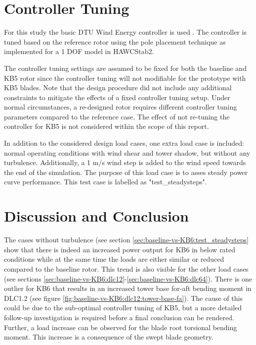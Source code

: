 \section{Controller Tuning}
\label{sec:dlb:Controller Tuning}

For this study the basic DTU Wind Energy controller is used \cite{hansen_basic_2013}. The controller is tuned based on the reference rotor using the pole placement technique as implemented for a 1 DOF model in HAWCStab2.

The controller tuning settings are assumed to be fixed for both the baseline and KB5 rotor since the controller tuning will not modifiable for the prototype with KB5 blades. Note that the design procedure did not include any additional constraints to mitigate the effects of a fixed controller tuning setup. Under normal circumstances, a re-designed rotor requires different controller tuning parameters compared to the reference case. The effect of not re-tuning the controller for KB5 is not considered within the scope of this report.

In addition to the considered design load cases, one extra load case is included: normal operating conditions with wind shear and tower shadow, but without any turbulence. Additionally, a 1 m/s wind step is added to the wind speed towards the end of the simulation. The purpose of this load case is to asses steady power curve performance. This test case is labelled as "test\_steadysteps".


\section{Discussion and Conclusion}
\label{sec:dlb:discussion}

The cases without turbulence (see section \ref{sec:baseline-vs-KB6:test_steadysteps} show that there is indeed an increased power output for KB6 in below rated conditions while at the same time the loads are either similar or reduced compared to the baseline rotor. This trend is also visible for the other load cases (see sections \ref{sec:baseline-vs-KB6:dlc12}-\ref{sec:baseline-vs-KB6:dlc64}). There is one outlier for KB6 that results in an increased tower base for-aft bending moment in DLC1.2 (see figure \ref{fig:baseline-vs-KB6:dlc12:tower-base-fa}). The cause of this could be due to the sub-optimal controller tuning of KB5, but a more detailed follow-up investigation is required before a final conclusion can be rendered. Further, a load increase can be observed for the blade root torsional bending moment. This increase is a consequence of the swept blade geometry.


